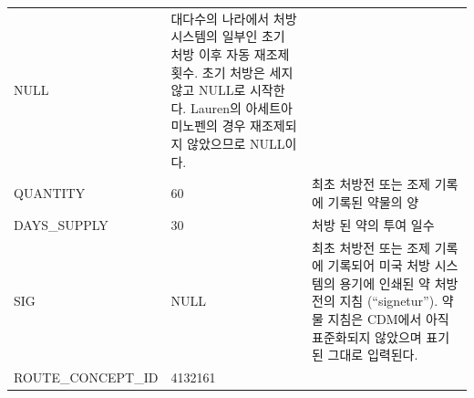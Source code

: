 \documentclass[10.5pt]{book}
\theoremstyle{definition}
\theoremstyle{definition}
\theoremstyle{definition}
\theoremstyle{remark}
\begin{document}
\begin{longtable}[]{@{}lll@{}}
\begin{minipage}[t]{0.16\columnwidth}
NULL\strut
\end{minipage} & \begin{minipage}[t]{0.48\columnwidth}\raggedright\strut
대다수의 나라에서 처방 시스템의 일부인 초기 처방 이후 자동 재조제 횟수.
초기 처방은 세지 않고 NULL로 시작한다. Lauren의 아세트아미노펜의 경우
재조제되지 않았으므로 NULL이다.\strut
\end{minipage}\tabularnewline
\begin{minipage}[t]{0.28\columnwidth}\raggedright\strut
QUANTITY\strut
\end{minipage} & \begin{minipage}[t]{0.16\columnwidth}\raggedright\strut
60\strut
\end{minipage} & \begin{minipage}[t]{0.48\columnwidth}\raggedright\strut
최초 처방전 또는 조제 기록에 기록된 약물의 양\strut
\end{minipage}\tabularnewline
\begin{minipage}[t]{0.28\columnwidth}\raggedright\strut
DAYS\_SUPPLY\strut
\end{minipage} & \begin{minipage}[t]{0.16\columnwidth}\raggedright\strut
30\strut
\end{minipage} & \begin{minipage}[t]{0.48\columnwidth}\raggedright\strut
처방 된 약의 투여 일수\strut
\end{minipage}\tabularnewline
\begin{minipage}[t]{0.28\columnwidth}\raggedright\strut
SIG\strut
\end{minipage} & \begin{minipage}[t]{0.16\columnwidth}\raggedright\strut
NULL\strut
\end{minipage} & \begin{minipage}[t]{0.48\columnwidth}\raggedright\strut
최초 처방전 또는 조제 기록에 기록되어 미국 처방 시스템의 용기에 인쇄된
약 처방전의 지침 (``signetur''). 약물 지침은 CDM에서 아직 표준화되지
않았으며 표기된 그대로 입력된다.\strut
\end{minipage}\tabularnewline
\begin{minipage}[t]{0.28\columnwidth}\raggedright\strut
ROUTE\_CONCEPT\_ID\strut
\end{minipage} & \begin{minipage}[t]{0.16\columnwidth}\raggedright\strut
4132161\strut
\end{minipage} & \begin{minipage}[t]{0.48\columnwidth}\raggedright\strut

\end{minipage}
\end{longtable}
\end{document}
